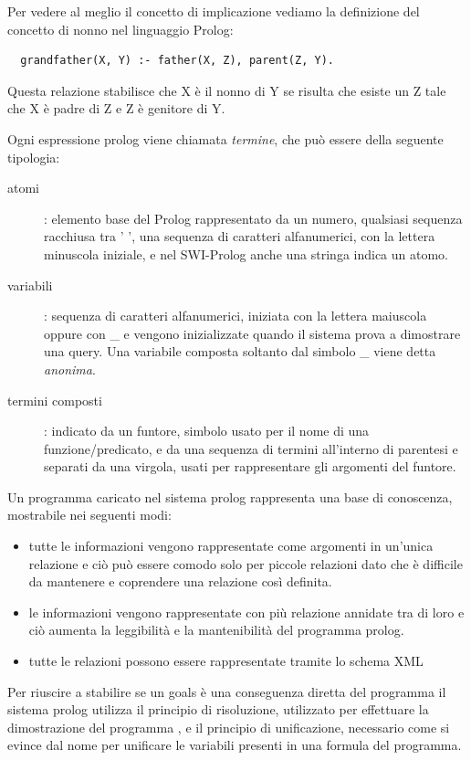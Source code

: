 Per vedere al meglio il concetto di implicazione vediamo la definizione del concetto di nonno nel linguaggio Prolog:
\begin{verbatim}
  grandfather(X, Y) :- father(X, Z), parent(Z, Y).
\end{verbatim}
Questa relazione stabilisce che X è il nonno di Y se risulta che esiste un Z tale che X è padre di Z e Z è genitore di Y.

Ogni espressione prolog viene chiamata \emph{termine}, che può essere della seguente tipologia:
\begin{description}
\item [atomi] : elemento base del Prolog rappresentato da un numero, qualsiasi sequenza racchiusa tra ' ',
       una sequenza di caratteri alfanumerici, con la lettera minuscola iniziale, e nel SWI-Prolog anche una stringa indica un atomo.

\item [variabili] : sequenza di caratteri alfanumerici, iniziata con la lettera maiuscola oppure con \_ e vengono inizializzate
                    quando il sistema prova a dimostrare una query.\newline
                    Una variabile composta soltanto dal simbolo \_ viene detta \emph{anonima}.

\item [termini composti]: indicato da un funtore, simbolo usato per il nome di una funzione/predicato, e da una sequenza
  di termini all'interno di parentesi e separati da una virgola, usati per rappresentare gli argomenti del funtore.
\end{description}

Un programma caricato nel sistema prolog rappresenta una base di conoscenza, mostrabile nei seguenti modi:
\begin{itemize}
\item tutte le informazioni vengono rappresentate come argomenti in un'unica relazione e ciò può essere comodo solo per
  piccole relazioni dato che è difficile da mantenere e coprendere una relazione così definita.
\item le informazioni vengono rappresentate con più relazione annidate tra di loro e ciò aumenta la leggibilità e
  la mantenibilità del programma prolog.
\item tutte le relazioni possono essere rappresentate tramite lo schema XML
\end{itemize}
Per riuscire a stabilire se un goals è una conseguenza diretta del programma il sistema prolog utilizza il principio di risoluzione,
utilizzato per effettuare la dimostrazione del programma , e il principio di unificazione, necessario come si evince dal nome per
unificare le variabili presenti in una formula del programma.

